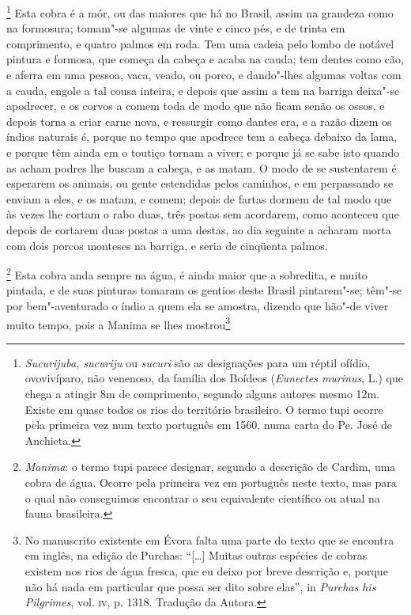 \footnote{ \textit{Sucurijuba, sucuriju}
ou \textit{sucuri} são as designações para um réptil ofídio,
ovovivíparo, não venenoso, da família dos Boídeos (\textit{Eunectes
murinus}, L.) que chega a atingir 8m de comprimento, segundo alguns
autores mesmo 12m. Existe em quase todos os rios do território
brasileiro. O termo tupi ocorre pela primeira vez num texto português
em 1560, numa carta do Pe. José de Anchieta.} Esta
cobra é a mór, ou das maiores que há no Brasil, assim na grandeza como
na formosura; tomam"-se algumas de vinte e cinco pés, e de trinta em
comprimento, e quatro palmos em roda. Tem uma cadeia pelo lombo de
notável pintura e formosa, que começa da cabeça e acaba na cauda; tem
dentes como cão, e aferra em uma pessoa, vaca, veado, ou porco, e
dando"-lhes algumas voltas com a cauda, engole a tal cousa inteira, e
depois que assim a tem na barriga deixa"-se apodrecer, e os corvos a
comem toda de modo que não ficam senão os ossos, e depois torna a criar
carne nova, e ressurgir como dantes era, e a razão dizem os índios
naturais é, porque no tempo que apodrece tem a cabeça debaixo da lama,
e porque têm ainda em o toutiço tornam a viver; e porque já se sabe
isto quando as acham podres lhe buscam a cabeça, e as matam. O modo de
se sustentarem é esperarem os animais, ou gente estendidas pelos
caminhos, e em perpassando se enviam a eles, e os matam, e comem;
depois de fartas dormem de tal modo que às vezes lhe cortam o rabo
duas, três postas sem acordarem, como aconteceu que depois de cortarem
duas postas a uma destas, ao dia seguinte a acharam morta com dois
porcos monteses na barriga, e seria de cinqüenta palmos.

\footnote{ \textit{Manima}: o termo tupi parece
designar, segundo a descrição de Cardim, uma cobra de água. Ocorre pela
primeira vez em português neste texto, mas para o qual não conseguimos
encontrar o seu equivalente científico ou atual na fauna
brasileira.} Esta cobra anda sempre na água, é ainda maior
que a sobredita, e muito pintada, e de suas pinturas tomaram os gentios
deste Brasil pintarem"-se; têm"-se por bem"-aventurado o índio a quem ela
se amostra, dizendo que hão"-de viver muito tempo, pois a Manima se lhes
mostrou\footnote{ No manuscrito existente em Évora falta uma parte
do texto que se encontra em inglês, na edição de Purchas: ``[\ldots] 
Muitas outras espécies de cobras existem nos rios de água fresca, que
eu deixo por breve descrição e, porque não há nada em particular que
possa ser dito sobre elas'', in \textit{Purchas his Pilgrimes}, vol.
\textsc{iv}, p. 1318. Tradução da Autora.} 


